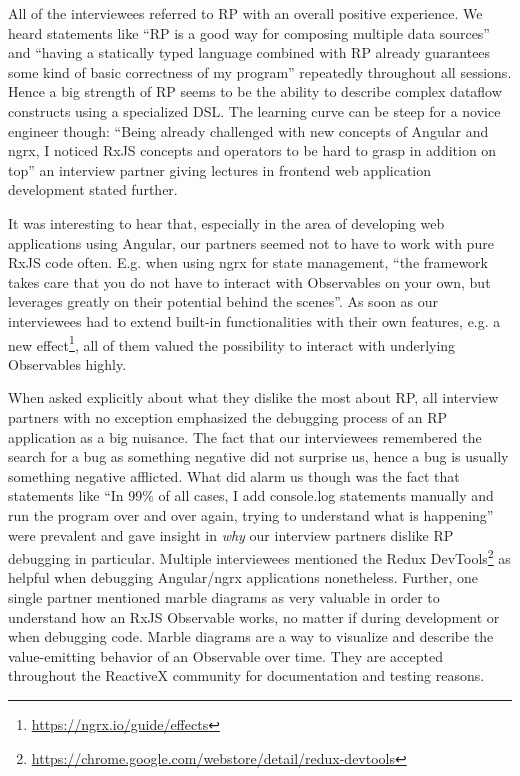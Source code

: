 \documentclass[12pt,a4paper]{article}
\begin{document}
All of the interviewees referred to RP with an overall positive experience. We heard statements like ``RP is a good way for composing multiple data sources'' and ``having a statically typed language combined with RP already guarantees some kind of basic correctness of my program'' repeatedly throughout all sessions. Hence a big strength of RP seems to be the ability to describe complex dataflow constructs using a specialized DSL. The learning curve can be steep for a novice engineer though: ``Being already challenged with new concepts of Angular and ngrx, I noticed RxJS concepts and operators to be hard to grasp in addition on top'' an interview partner giving lectures in frontend web application development stated further.

It was interesting to hear that, especially in the area of developing web applications using Angular, our partners seemed not to have to work with pure RxJS code often. E.g. when using ngrx for state management, ``the framework takes care that you do not have to interact with Observables on your own, but leverages greatly on their potential behind the scenes''. As soon as our interviewees had to extend built-in functionalities with their own features, e.g. a new effect\footnote{\url{https://ngrx.io/guide/effects}}, all of them valued the possibility to interact with underlying Observables highly.

When asked explicitly about what they dislike the most about RP, all interview partners with no exception emphasized the debugging process of an RP application as a big nuisance. The fact that our interviewees remembered the search for a bug as something negative did not surprise us, hence a bug is usually something negative afflicted. What did alarm us though was the fact that statements like ``In 99\% of all cases, I add console.log statements manually and run the program over and over again, trying to understand what is happening'' were prevalent and gave insight in \emph{why} our interview partners dislike RP debugging in particular. Multiple interviewees mentioned the Redux DevTools\footnote{\url{https://chrome.google.com/webstore/detail/redux-devtools}} as helpful when debugging Angular/ngrx applications nonetheless. Further, one single partner mentioned marble diagrams as very valuable in order to understand how an RxJS Observable works, no matter if during development or when debugging code. Marble diagrams are a way to visualize and describe the value-emitting behavior of an Observable over time. They are accepted throughout the ReactiveX community for documentation\cite{marblediagrams} and testing reasons\cite{marbletesting}.
\end{document}
